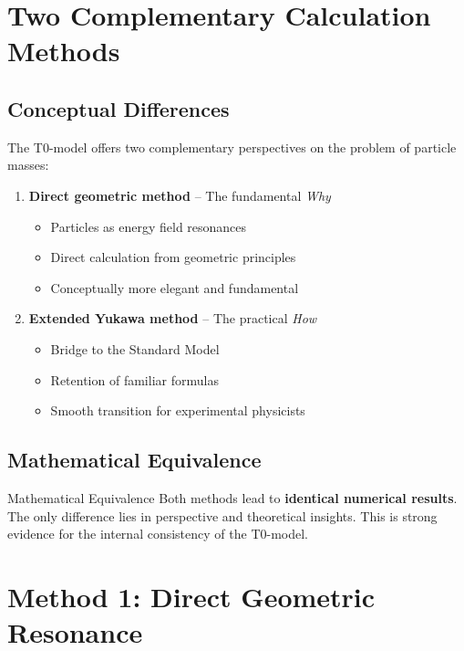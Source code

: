 \documentclass[12pt,a4paper]{article}
\begin{document}
	\section{Two Complementary Calculation Methods}
	\label{sec:two_calculation_methods}
	
	\subsection{Conceptual Differences}
	\label{subsec:conceptual_differences}
	
	The T0-model offers two complementary perspectives on the problem of particle masses:
	
	\begin{enumerate}
		\item \textbf{Direct geometric method} -- The fundamental \textit{Why}
		\begin{itemize}
			\item Particles as energy field resonances
			\item Direct calculation from geometric principles
			\item Conceptually more elegant and fundamental
		\end{itemize}
		
		\item \textbf{Extended Yukawa method} -- The practical \textit{How}
		\begin{itemize}
			\item Bridge to the Standard Model
			\item Retention of familiar formulas
			\item Smooth transition for experimental physicists
		\end{itemize}
	\end{enumerate}
	
	\subsection{Mathematical Equivalence}
	\label{subsec:mathematical_equivalence}
	
	\begin{keyresult}{Mathematical Equivalence}{}
		Both methods lead to \textbf{identical numerical results}. The only difference lies in perspective and theoretical insights. This is strong evidence for the internal consistency of the T0-model.
	\end{keyresult}
	
	\section{Method 1: Direct Geometric Resonance}
	\label{sec:direct_geometric_method}
	
\end{document}
